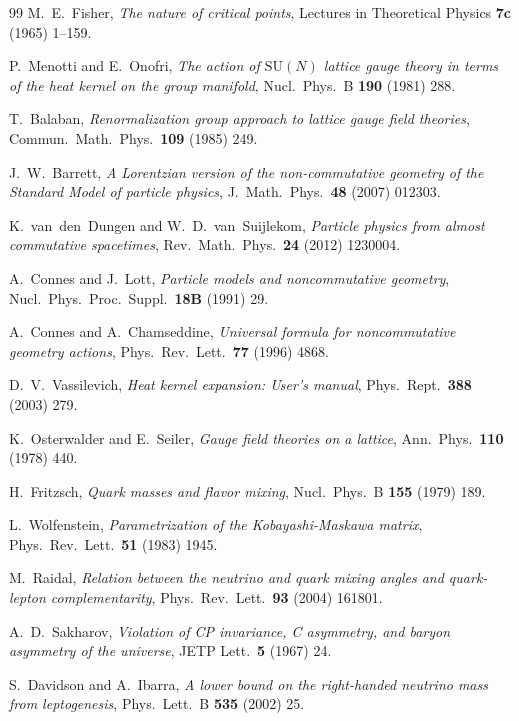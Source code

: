 \documentclass[12pt]{article}
\theoremstyle{definition}
\theoremstyle{remark}
\newcommand{\SU}{\mathrm{SU}}
\begin{document}
\begin{thebibliography}{99}
M.~E.~Fisher,
\emph{The nature of critical points},
Lectures in Theoretical Physics \textbf{7c} (1965) 1--159.

P.~Menotti and E.~Onofri,
\emph{The action of $\SU(N)$ lattice gauge theory in terms of the heat
kernel on the group manifold},
Nucl.\ Phys.\ B \textbf{190} (1981) 288.

T.~Balaban,
\emph{Renormalization group approach to lattice gauge field theories},
Commun.\ Math.\ Phys.\ \textbf{109} (1985) 249.

J.~W.~Barrett,
\emph{A Lorentzian version of the non-commutative geometry of the Standard Model of particle physics},
J.\ Math.\ Phys.\ \textbf{48} (2007) 012303.

K.~van~den~Dungen and W.~D.~van~Suijlekom,
\emph{Particle physics from almost commutative spacetimes},
Rev.\ Math.\ Phys.\ \textbf{24} (2012) 1230004.

A.~Connes and J.~Lott,
\emph{Particle models and noncommutative geometry},
Nucl.\ Phys.\ Proc.\ Suppl.\ \textbf{18B} (1991) 29.

A.~Connes and A.~Chamseddine,
\emph{Universal formula for noncommutative geometry actions},
Phys.\ Rev.\ Lett.\ \textbf{77} (1996) 4868.

D.~V.~Vassilevich,
\emph{Heat kernel expansion: User's manual},
Phys.\ Rept.\ \textbf{388} (2003) 279.

K.~Osterwalder and E.~Seiler,
\emph{Gauge field theories on a lattice},
Ann.\ Phys.\ \textbf{110} (1978) 440.

H.~Fritzsch,
\emph{Quark masses and flavor mixing},
Nucl.\ Phys.\ B \textbf{155} (1979) 189.

L.~Wolfenstein,
\emph{Parametrization of the Kobayashi-Maskawa matrix},
Phys.\ Rev.\ Lett.\ \textbf{51} (1983) 1945.

M.~Raidal,
\emph{Relation between the neutrino and quark mixing angles and quark-lepton complementarity},
Phys.\ Rev.\ Lett.\ \textbf{93} (2004) 161801.

A.~D.~Sakharov,
\emph{Violation of CP invariance, C asymmetry, and baryon asymmetry of the universe},
JETP Lett.\ \textbf{5} (1967) 24.

S.~Davidson and A.~Ibarra,
\emph{A lower bound on the right-handed neutrino mass from leptogenesis},
Phys.\ Lett.\ B \textbf{535} (2002) 25.


\end{thebibliography}
\end{document}
